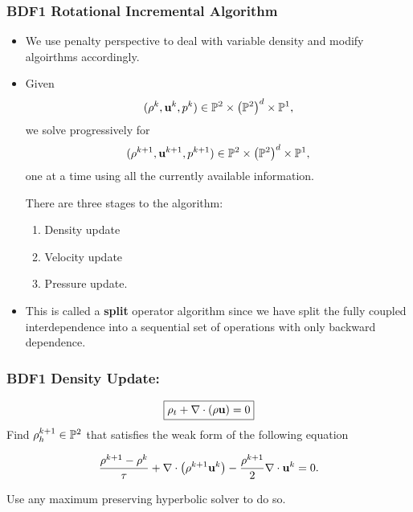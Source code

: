 \documentclass{beamer}
\begin{document}
\begin{frame}
  \frametitle{BDF1 Rotational Incremental Algorithm}
  \begin{itemize}
    \item<1-> We use penalty perspective to deal with variable density and modify algoirthms accordingly.
    \item <1-> Given 
    \[(\rho^{k}, \textbf{u}^{k}, p^{k})\in \mathbb{P}^2\times\left(\mathbb{P}^2\right)^d\times\mathbb{P}^1,\]  
    we solve progressively for 
    \begin{equation*}
      (\rho^{k+1}, \textbf{u}^{k+1}, p^{k+1})\in \mathbb{P}^2\times\left(\mathbb{P}^2\right)^d\times\mathbb{P}^1,
    \end{equation*}
    one at a time using all the currently available information. 
    
    There are three stages to the algorithm: 
    \begin{enumerate}
      \item Density update
      \item Velocity update
      \item Pressure update.
    \end{enumerate}
     
    \item<2-> This is called a \textbf{split} operator algorithm since we have split the fully coupled interdependence into a sequential set of operations with only backward dependence.
    \end{itemize}
\end{frame}

\begin{frame}
  \frametitle{BDF1 Density Update:}
  \begin{equation*}\boxed{
    \rho_t + \nabla\cdot\left(\rho\textbf{u}\right) = 0}
  \end{equation*}
  \vfill
  Find $\rho_h^{k+1}\in \mathbb{P}^2$ that satisfies the weak form of the following equation
  \begin{block}{}
    \begin{equation*}
      \frac{\rho^{k+1} - \rho^k}{\tau} + \nabla\cdot\left(\rho^{k+1}\textbf{u}^{k} \right) - \frac{\rho^{k+1}}{2}\nabla\cdot\textbf{u}^{k} = 0.
    \end{equation*}
  \end{block}
  Use any maximum preserving hyperbolic solver to do so.
\end{frame}
      
\end{document}
